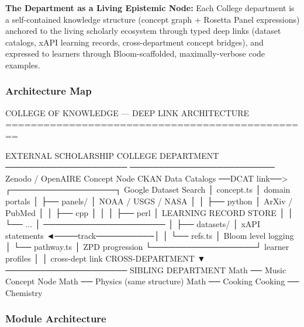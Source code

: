 \documentclass[11pt,letterpaper]{article}
\begin{document}
\textbf{The Department as a Living Epistemic Node:} Each College department is a self-contained knowledge structure (concept graph + Rosetta Panel expressions) anchored to the living scholarly ecosystem through typed deep links (dataset catalogs, xAPI learning records, cross-department concept bridges), and expressed to learners through Bloom-scaffolded, maximally-verbose code examples.

\subsubsection{Architecture Map}

\begin{asciibox}
COLLEGE OF KNOWLEDGE --- DEEP LINK ARCHITECTURE
================================================

  EXTERNAL SCHOLARSHIP                  COLLEGE DEPARTMENT
  ─────────────────────                ─────────────────────────
  Zenodo / OpenAIRE                    Concept Node
  CKAN Data Catalogs   ──DCAT link──>  ┌──────────────────┐
  Google Dataset Search                │  concept.ts       │
  domain portals                       │  ├── panels/      │
  NOAA / USGS / NASA                   │  │   ├── python   │
  ArXiv / PubMed                       │  │   ├── cpp      │
                                       │  │   ├── perl     │
  LEARNING RECORD STORE                │  │   └── ...      │
  ─────────────────────                │  ├── datasets/    │
  xAPI statements ◄────track──────────│  │   └── refs.ts  │
  Bloom level logging                  │  └── pathway.ts  │
  ZPD progression                      └──────────────────┘
  learner profiles                              │
                                               │ cross-dept link
  CROSS-DEPARTMENT                              ▼
  ─────────────────────                SIBLING DEPARTMENT
  Math ── Music                        Concept Node
  Math ── Physics                      (same structure)
  Math ── Cooking
  Cooking ── Chemistry
\end{asciibox}

\subsubsection{Module Architecture}
\end{document}
